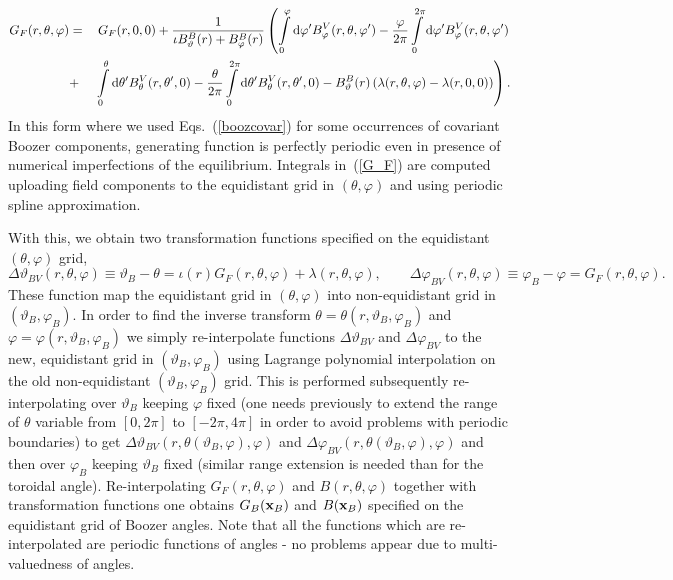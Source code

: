 \documentclass[12pt]{article}
\newcommand{\be}[1]{\begin{equation} \label{#1}}
\newcommand{\ee}{\end{equation}}
\newcommand{\bea}[1]{\begin{eqnarray} \label{#1}}
\newcommand{\eea}{\end{eqnarray}}
\newcommand{\eq}[1]{(\ref{#1})}
\newcommand{\bx}{{\bf x}}
\newcommand{\rd}{{\rm d}}
\begin{document}
\bea{G_F}
G_F(r,\theta,\varphi)
&=&
G_F(r,0,0)+
\frac{1}{\iota B_\vartheta^B(r)+B_\varphi^B(r)}
\left(
\int\limits_0^\varphi\rd\varphi^\prime B_\varphi^V(r,\theta,\varphi^\prime)
-\frac{\varphi}{2\pi}\int\limits_0^{2\pi}\rd\varphi^\prime B_\varphi^V(r,\theta,\varphi^\prime)
\right.
\nonumber \\
&+&
\left.
\int\limits_0^\theta\rd\theta^\prime B_\theta^V(r,\theta^\prime,0)
-\frac{\theta}{2\pi}\int\limits_0^{2\pi}\rd\theta^\prime B_\theta^V(r,\theta^\prime,0)
-B_\vartheta^B(r)\left(\lambda(r,\theta,\varphi)-\lambda(r,0,0)\right)
\right).
\eea
In this form where we used Eqs.~\eq{boozcovar} for some occurrences of covariant Boozer components,
generating function is perfectly periodic even in presence of numerical imperfections of the equilibrium.
Integrals in~\eq{G_F} are computed uploading field components to the equidistant grid in $(\theta,\varphi)$
and using periodic spline approximation.

With this, we obtain two transformation functions specified on the equidistant $(\theta,\varphi)$ grid,
\be{deltp_BV}
\Delta\vartheta_{BV}(r,\theta,\varphi)\equiv\vartheta_B-\theta
=\iota(r) G_F(r,\theta,\varphi)+\lambda(r,\theta,\varphi),
\qquad
\Delta\varphi_{BV}(r,\theta,\varphi)\equiv \varphi_B-\varphi
=G_F(r,\theta,\varphi).
\ee
These function map the equidistant grid in $(\theta,\varphi)$ into non-equidistant grid in
$(\vartheta_B,\varphi_B)$. In order to find the inverse transform $\theta=\theta(r,\vartheta_B,\varphi_B)$
and $\varphi=\varphi(r,\vartheta_B,\varphi_B)$ we simply re-interpolate functions $\Delta\vartheta_{BV}$
and $\Delta\varphi_{BV}$ to the new, equidistant grid in $(\vartheta_B,\varphi_B)$ using Lagrange polynomial
interpolation on the old non-equidistant $(\vartheta_B,\varphi_B)$ grid. This is performed subsequently
re-interpolating over $\vartheta_B$ keeping $\varphi$ fixed (one needs previously to extend the range of $\theta$
variable from $[0,2\pi]$ to $[-2\pi,4\pi]$ in order to avoid problems with periodic boundaries)
to get $\Delta\vartheta_{BV}(r,\theta(\vartheta_B,\varphi),\varphi)$ and
$\Delta\varphi_{BV}(r,\theta(\vartheta_B,\varphi),\varphi)$
and then over $\varphi_B$ keeping $\vartheta_B$ fixed (similar range extension is needed than for the toroidal 
angle).
Re-interpolating $G_F(r,\theta,\varphi)$ and $B(r,\theta,\varphi)$ together with transformation functions
one obtains $G_B(\bx_B)$ and $B(\bx_B)$ specified on the equidistant grid of Boozer angles.
Note that all the functions which are re-interpolated are periodic functions of angles - no problems appear
due to multi-valuedness of angles.
\end{document}
